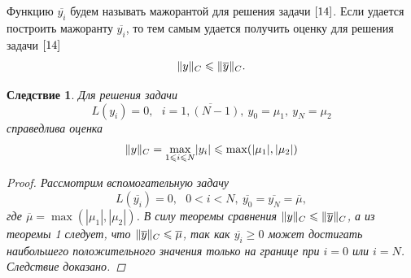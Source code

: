 \documentclass[11pt,a4paper,twoside,listtotoc,bibtotoc]{report}
\numberwithin{equation}{section}
\theoremstyle{definition}
\theoremstyle{plain}
\newtheorem{cons}{Следствие}[section]
\DeclarePairedDelimiter\norm{\lVert}{\rVert}
\begin{document}
Функцию $\overline{y_i}$ будем называть мажорантой для решения задачи $\eqref{14}$.
Если удается построить мажоранту $\overline{y_i}$, то тем самым удается получить
оценку для решения задачи $\eqref{14}$
%
$$
    \norm{y}_C \leqslant \norm{\overline{y}}_C.
$$
%
\begin{cons}
%
    Для решения задачи
    $$
        L(y_i)=0,~~~i=\overline{1,(N-1)},~y_0=\mu_1,~y_N=\mu_2
    $$
    справедлива оценка
    \begin{equation}
        \label{17}
        \norm{y}_C=\underset{1\leqslant i\leqslant N}\max |y_i|
        \leqslant \max(|\mu_1|, |\mu_2|)
    \end{equation}
    \begin{proof}
        Рассмотрим вспомогательную задачу
        $$
            L(\overline{y_i})=0,~~~0<i<N,~\overline{y_0}=\overline{y_N}=
            \overline{\mu},
        $$
        где $\overline{\mu} = \max(|\mu_1|, |\mu_2|)$. В силу теоремы сравнения
        $\norm{y}_C \leqslant \norm{\overline{y}}_C$, а из теоремы 1 следует,
        что $\norm{\overline{y}}_C \leqslant \overline{\mu}$, так как
        $\overline{y_i} \geqslant 0$ может достигать наибольшего положительного
        значения только на границе при $i=0$ или $i=N$. Следствие доказано.
    \end{proof}
%
\end{cons}
%
%
\end{document}
